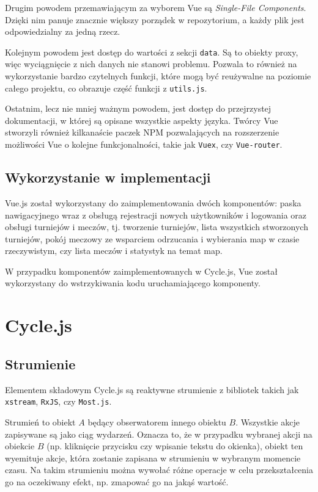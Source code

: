\documentclass[shortabstract]{iithesis}
\theoremstyle{definition} \newtheorem{definition}{Definicja}[]
\theoremstyle{remark} \newtheorem{remark}[definition]{Observation}
\theoremstyle{plain} \newtheorem{theorem}[definition]{Theorem}
\theoremstyle{plain} \newtheorem{lemma}[definition]{Lemma}
\begin{document}
Drugim powodem przemawiającym za wyborem Vue są \textit{Single-File Components}. Dzięki nim panuje znacznie większy porządek w repozytorium, a każdy plik jest odpowiedzialny za jedną rzecz.

Kolejnym powodem jest dostęp do wartości z sekcji \texttt{data}. Są to obiekty proxy, więc wyciągnięcie z nich danych nie stanowi problemu. Pozwala to również na wykorzystanie bardzo czytelnych funkcji, które mogą być reużywalne na poziomie całego projektu, co obrazuje część funkcji z \texttt{utils.js}.

Ostatnim, lecz nie mniej ważnym powodem, jest dostęp do przejrzystej dokumentacji, w której są opisane wszystkie aspekty języka. Twórcy Vue stworzyli również kilkanaście paczek NPM pozwalających na rozszerzenie możliwości Vue o kolejne funkcjonalności, takie jak \texttt{Vuex}, czy \texttt{Vue-router}.

\subsection{Wykorzystanie w implementacji}
Vue.js został wykorzystany do zaimplementowania dwóch komponentów: paska nawigacyjnego wraz z obsługą rejestracji nowych użytkowników i logowania oraz obsługi turniejów i meczów, tj. tworzenie turniejów, lista wszystkich stworzonych turniejów, pokój meczowy ze wsparciem odrzucania i wybierania map w czasie rzeczywistym, czy lista meczów i statystyk na temat map.

W przypadku komponentów zaimplementowanych w Cycle.js, Vue został wykorzystany do wstrzykiwania kodu uruchamiającego komponenty.


\section{Cycle.js}
\subsection{Strumienie}

Elementem składowym Cycle.js są reaktywne strumienie z bibliotek takich jak \texttt{xstream}, \texttt{RxJS}, czy \texttt{Most.js}.

Strumień to obiekt $A$ będący obserwatorem innego obiektu $B$. Wszystkie akcje zapisywane są jako ciąg wydarzeń. Oznacza to, że w przypadku wybranej akcji na obiekcie $B$ (np. kliknięcie przycisku czy wpisanie tekstu do okienka), obiekt ten wyemituje akcje, która zostanie zapisana w strumieniu w wybranym momencie czasu. Na takim strumieniu można wywołać różne operacje w celu przekształcenia go na oczekiwany efekt, np. zmapować go na jakąś wartość.
\end{document}
